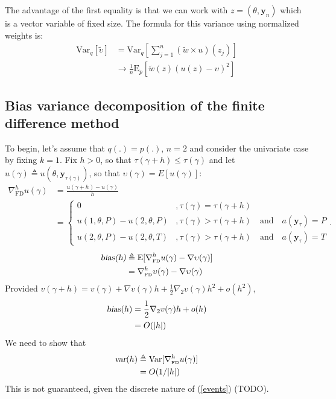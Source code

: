 \documentclass[11pt]{article}
\begin{document}
The advantage of the first equality is that we can work with
$z=(\theta,\mathbf{y}_{n})$ which is a vector variable of fixed
size. The formula for this variance using normalized weights is:
\begin{align}
\mathrm{Var}_q[\tilde\upsilon]&=\mathrm{Var}_q[\sum_{j=1}^n
(\tilde w \times u)(z_j)]\\
&\rightarrow\frac{1}{n}\mathrm{E}_p[\tilde w(z)(u(z)-\upsilon)^2]
\end{align}
\subsection{Bias variance decomposition of the finite difference method}
To begin, let's assume that $q(.)=p(.)$, $n=2$ and consider the
univariate case by fixing $k=1$. Fix $h>0$, so that
$\tau(\gamma+h)\leq\tau(\gamma)$ and let $u(\gamma)\triangleq
u(\theta,\mathbf{y}_{\tau(\gamma)})$, so that
$\upsilon(\gamma)=E[u(\gamma)]$:
\begin{align}
\nabla_\mathrm{\scriptscriptstyle FD}^h
u(\gamma)&=\frac{u(\gamma+h)-
u(\gamma)}{h}\\&=\label{events}\begin{cases}
0&, \tau(\gamma)=\tau(\gamma+h)\\
u(1,\theta,P)-u(2,\theta,P)&, \tau(\gamma)>\tau(\gamma+h) \quad \mathrm{and}\quad a(\mathbf{y}_\tau)=P\\
u(2,\theta,P)-u(2,\theta,T)&, \tau(\gamma)>\tau(\gamma+h) \quad
\mathrm{and}\quad a(\mathbf{y}_\tau)=T
\end{cases}.
\end{align}
\begin{align}\textsl{bias(h)}&\triangleq
\mathrm{E}[\nabla_\mathrm{\scriptscriptstyle FD}^h u(\gamma)-\nabla
\upsilon(\gamma)]\\&=\nabla_\mathrm{\scriptscriptstyle FD}^h
\upsilon(\gamma)-\nabla \upsilon(\gamma)
\end{align}
Provided $v(\gamma+h)=v(\gamma)+\nabla v(\gamma)h+\frac{1}{2}
\nabla_2 v(\gamma)h^2+o(h^2)$,
\begin{align}
\textsl{bias}(h)&=\frac{1}{2} \nabla_2 v(\gamma)h+o(h)\\&=O(|h|)
\end{align}We need to show that
\begin{align}
\textsl{var}(h)&\triangleq\mathrm{Var}[\nabla_\mathrm{\scriptscriptstyle
FD}^h u(\gamma)]\\&=O(1/|h|)
\end{align}This is not guaranteed, given the discrete nature of
(\ref{events}) (TODO).
\end{document}
